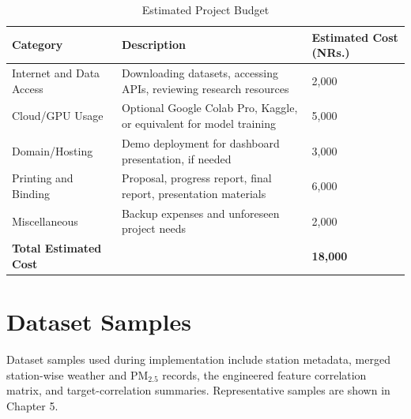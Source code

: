 \begin{table}[H]
    \centering
    \small
    \caption{Estimated Project Budget}
    \label{tab:estimated_project_budget}
    \renewcommand{\arraystretch}{1.2}
    \begin{tabularx}{0.94\linewidth}{|X|X|X|}
        \hline
        \textbf{Category} & \textbf{Description} & \textbf{Estimated Cost (NRs.)} \\
        \hline
        Internet and Data Access & Downloading datasets, accessing APIs, reviewing research resources & 2,000 \\
        \hline
        Cloud/GPU Usage & Optional Google Colab Pro, Kaggle, or equivalent for model training & 5,000 \\
        \hline
        Domain/Hosting & Demo deployment for dashboard presentation, if needed & 3,000 \\
        \hline
        Printing and Binding & Proposal, progress report, final report, presentation materials & 6,000 \\
        \hline
        Miscellaneous & Backup expenses and unforeseen project needs & 2,000 \\
        \hline
        \textbf{Total Estimated Cost} &  & \textbf{18,000} \\
        \hline
    \end{tabularx}
\end{table}


\section{Dataset Samples}


Dataset samples used during implementation include station metadata, merged station-wise weather and PM$_{2.5}$ records, the engineered feature correlation matrix, and target-correlation summaries. Representative samples are shown in Chapter 5.
